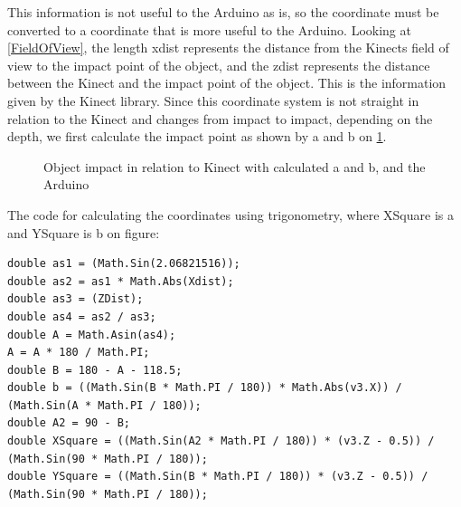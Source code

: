 This information is not useful to the Arduino as is, so the coordinate must be converted to a coordinate that is more useful to the Arduino.
Looking at \ref{FieldOfView}, the length xdist represents the distance from the Kinects field of view to the impact point of the object, and the zdist represents the distance between the Kinect and the impact point of the object. This is the information given by the Kinect library.
Since this coordinate system is not straight in relation to the Kinect and changes from impact to impact, depending on the depth, we first calculate the impact point as shown by a and b on \ref{FieldOfView2}.

\begin{figure}[h]
	\centering
	\caption{Object impact in relation to Kinect with calculated a and b, and the Arduino}
	\label{FieldOfView2}
\end{figure}

The code for calculating the coordinates using trigonometry, where XSquare is a and YSquare is b on figure:

\begin{lstlisting}
double as1 = (Math.Sin(2.06821516));
double as2 = as1 * Math.Abs(Xdist);
double as3 = (ZDist);
double as4 = as2 / as3;
double A = Math.Asin(as4);
A = A * 180 / Math.PI;
double B = 180 - A - 118.5;
double b = ((Math.Sin(B * Math.PI / 180)) * Math.Abs(v3.X)) / (Math.Sin(A * Math.PI / 180));
double A2 = 90 - B;
double XSquare = ((Math.Sin(A2 * Math.PI / 180)) * (v3.Z - 0.5)) / (Math.Sin(90 * Math.PI / 180));
double YSquare = ((Math.Sin(B * Math.PI / 180)) * (v3.Z - 0.5)) / (Math.Sin(90 * Math.PI / 180));
\end{lstlisting}

